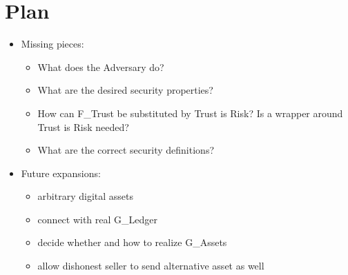 \section{Plan}
\label{sec:plan}
  \begin{itemize}
    \item Missing pieces:
    \begin{itemize}
      \item What does the Adversary do?
      \item What are the desired security properties?
      \item How can F\_Trust be substituted by Trust is Risk? Is a wrapper around Trust is
      Risk needed?
      \item What are the correct security definitions?
    \end{itemize}
    \item Future expansions:
    \begin{itemize}
      \item arbitrary digital assets
      \item connect with real G\_Ledger
      \item decide whether and how to realize G\_Assets
      \item allow dishonest seller to send alternative asset as well
    \end{itemize}
  \end{itemize}

